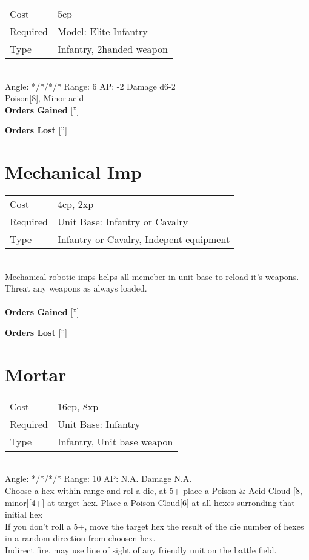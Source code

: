 \begin{tabular}{ll}
    Cost & 5cp \\
    Required & Model: Elite Infantry\\
    Type & Infantry, 2handed weapon\\
\end{tabular}
\ \\
\indent Angle: */*/*/* Range: 6  AP: -2 Damage d6-2 \\
Poison[8], Minor acid
\ \\

{\bf Orders Gained}
['']

{\bf Orders Lost}
['']
\section{ Mechanical Imp }

\begin{tabular}{ll}
    Cost & 4cp, 2xp \\
    Required & Unit Base: Infantry or Cavalry\\
    Type & Infantry or Cavalry, Indepent equipment\\
\end{tabular}
\ \\
Mechanical robotic imps helps all memeber in unit base to reload it's weapons. Threat any weapons as always loaded. \\

\ \\

{\bf Orders Gained}
['']

{\bf Orders Lost}
['']
\section{ Mortar }

\begin{tabular}{ll}
    Cost & 16cp, 8xp \\
    Required & Unit Base: Infantry\\
    Type & Infantry, Unit base weapon\\
\end{tabular}
\ \\
\indent Angle: */*/*/* Range: 10  AP: N.A. Damage N.A. \\
Choose a hex within range and rol a die, at 5+ place a Poison \& Acid Cloud [8, minor][4+] at target hex. Place a Poison Cloud[6]  at all hexes surronding that initial hex\\ If you don't roll a 5+, move the target hex the result of the die number of hexes in a random direction from choosen hex.  \\ Indirect fire. may use line of sight of any friendly unit on the battle field.
\ \\

